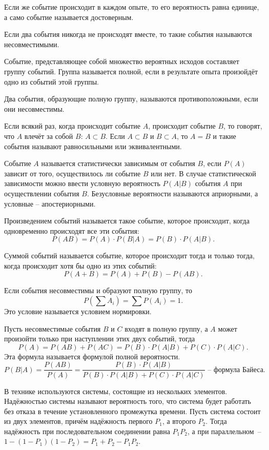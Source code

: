 Если же событие происходит в каждом опыте, то его вероятность равна единице, а
само событие называется достоверным.

Если два события никогда не происходят вместе, то такие события называются
несовместимыми.

Событие, представляющее собой множество вероятных исходов составляет группу
событий. Группа называется полной, если в результате опыта произойдёт одно из
событий этой группы.

Два события, образующие полную группу, называются противоположными, если они
несовместимы.

Если всякий раз, когда происходит событие \( A \), происходит событие \( B \),
то говорят, что \( A \) влечёт за собой \( B \): \( A \subset B \). Если
\( A \subset B \) и \( B \subset A \), то \( A = B \) и такие события называют
равносильными или эквивалентными.

Событие \( A \) называется статистически зависимым от события \( B \), если
\( P(A) \) зависит от того, осуществилось ли событие \( B \) или нет. В случае
статистической зависимости можно ввести условную вероятность \( P(A|B) \)
события \( A \) при осуществлении события \( B \). Безусловные вероятности
называются априорными, а условные -- апостериорными.

Произведением событий называется такое событие, которое происходит, когда
одновременно происходят все эти события:
\[
    P(AB) = P(A) \cdot P(B|A) = P(B) \cdot P(A|B).
\]

Суммой событий называется событие, которое происходит тогда и только тогда,
когда происходит хотя бы одно из этих событий:
\[
    P(A+B) = P(A) + P(B) - P(AB).
\]

Если события несовместимы и образуют полную группу, то
\[
    P\left(\sum A_i\right) = \sum P(A_i) = 1.
\]
Это условие называется условием нормировки.

Пусть несовместимые события \( B \) и \( C \) входят в полную группу, а \( A \)
может произойти только при наступлении этих двух событий, тогда
\[
    P(A) = P(AB) + P(AC) = P(B) \cdot P(A|B) + P(C) \cdot P(A|C).
\]
Эта формула называется формулой полной вероятности.
\[
    P(B|A) = \frac{P(AB)}{P(A)} = \frac{P(B) \cdot P(A|B)}
    {P(B) \cdot P(A|B) + P(C) \cdot P(A|C)} \text{ -- формула Байеса.}
\]

В технике используются системы, состоящие из нескольких элементов. Надёжностью
системы называют вероятность того, что система будет работать без отказа в
течение установленного промежутка времени. Пусть система состоит из двух
элементов, причём надёжность первого \( P_1 \), а второго \( P_2 \). Тогда
надёжность при последовательном соединении равна \( P_1P_2 \),  а при
параллельном~--\\ \( 1 - (1 - P_1)(1 - P_2) = P_1 + P_2 - P_1P_2 \).

